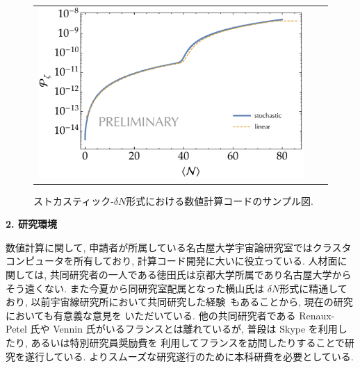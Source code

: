 \documentclass[11pt,a4j,dvipdfmx]{jarticle} 					%
\newcommand{\研究課題名}{\mgfamily\sffamily ストカスティック形式で迫る重力と量子論}
\newcommand{\研究機関名}{\mgfamily\sffamily 名古屋大学}
\newcommand{\研究代表者氏名}{\mgfamily\sffamily 多田祐一郎}
\newcommand{\研究期間の最終元号年度}{34}  %
\begin{document}
\begin{figure}[htbp]
\begin{tabular}{ccc}
\begin{minipage}{0.25\hsize}
		\end{minipage}
		\begin{minipage}{0.5\hsize}
			\centering
			\includegraphics[width=\hsize]{figs/Pzeta_conf.pdf}
		\end{minipage}
	\end{tabular}
	\caption{ストカスティック-$\delta N$形式における数値計算コードのサンプル図.}
	\label{fig: StocDeltaN}
\end{figure}


\begin{mdframed}[roundcorner=0.5zw,
	innertopmargin=0.8zw,innerbottommargin=0.8zw,
	linecolor=black!50,linewidth=0.2zw,
	backgroundcolor=black!10]
	{\bfseries\gtfamily\sffamily\large 2. 研究環境}
\end{mdframed}

数値計算に関して, 申請者が所属している名古屋大学宇宙論研究室ではクラスタコンピュータを所有しており, 計算コード開発に大いに役立っている.
人材面に関しては, 共同研究者の一人である徳田氏は京都大学所属であり名古屋大学からそう遠くない. また今夏から同研究室配属となった横山氏は
$\delta N$形式に精通しており, 以前宇宙線研究所において共同研究した経験~\cite{Tada:2015noa}もあることから, 現在の研究においても有意義な意見を
いただいている. 他の共同研究者である Renaux-Petel 氏や Vennin 氏がいるフランスとは離れているが, 普段は Skype を利用したり, あるいは特別研究員奨励費を
利用してフランスを訪問したりすることで研究を遂行している.
よりスムーズな研究遂行のために本科研費を必要としている.
\end{document}

